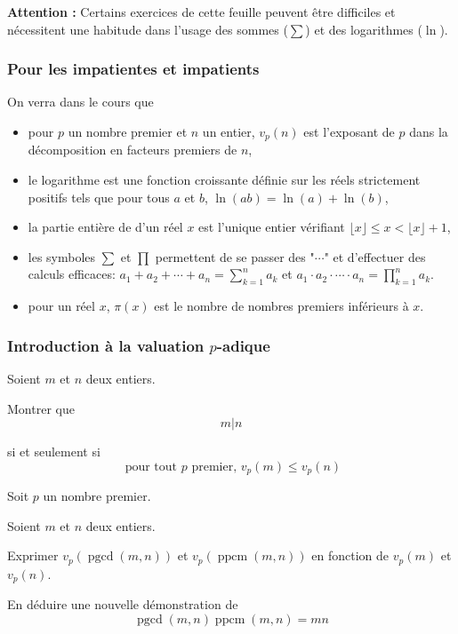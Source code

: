 

\textbf{Attention :} Certains exercices de cette feuille peuvent être difficiles et nécessitent une habitude dans l'usage des sommes ($\sum$) et des logarithmes ($\ln$).


\subsubsection{Pour les impatientes et impatients}


On verra dans le cours que

\begin{itemize}
\item pour $p$ un nombre premier et $n$ un entier, $v_p(n)$ est l'exposant de $p$ dans la décomposition en facteurs premiers de $n$,
\item le logarithme est une fonction croissante définie sur les réels strictement positifs tels que pour tous $a$ et $b$, $\ln(ab) = \ln(a) + \ln(b)$,
\item la partie entière de d'un réel $x$ est l'unique entier vérifiant $\lfloor x \rfloor \le x < \lfloor x \rfloor + 1$,
\item les symboles $\sum$ et $\prod$ permettent de se passer des "$\cdots$" et d'effectuer des calculs efficaces: $a_1 + a_2 + \cdots + a_n = \sum_{k = 1}^n a_k$ et $a_1 \cdot a_2 \cdot \cdots \cdot a_n = \prod_{k = 1}^n a_k$.
\item pour un réel $x$, $\pi(x)$ est le nombre de nombres premiers inférieurs à $x$.
\end{itemize}


\subsubsection{Introduction à la valuation $p$-adique}

\begin{exo}
Soient $m$ et $n$ deux entiers.

Montrer que
$$m | n$$

si et seulement si
$$\text{ pour tout } p \text{ premier, } v_p(m) \le v_p(n)$$
\end{exo}

\begin{exo}
Soit $p$ un nombre premier.

Soient $m$ et $n$ deux entiers.

Exprimer $v_p(\operatorname{pgcd}(m,n))$ et $v_p(\operatorname{ppcm}(m,n))$ en fonction de $v_p(m)$ et $v_p(n)$.

En déduire une nouvelle démonstration de
$$\operatorname{pgcd}(m,n) \operatorname{ppcm}(m,n) = m n$$
\end{exo}



